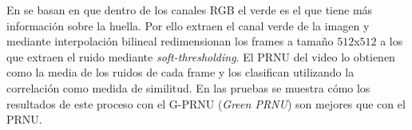 En \cite{gprnu:2016} se basan en que dentro de los canales RGB el verde es el que tiene más información sobre la huella. Por ello extraen el canal verde de la imagen y mediante interpolación bilineal redimensionan los frames a tama\~no $512$x$512$ a los que extraen el ruido mediante \textit{soft-thresholding}. El PRNU del video lo obtienen como la media de los ruidos de cada frame y los clasifican utilizando la correlación como medida de similitud. En las pruebas se muestra cómo los resultados de este proceso con el G-PRNU (\textit{Green PRNU}) son mejores que con el PRNU. \\
